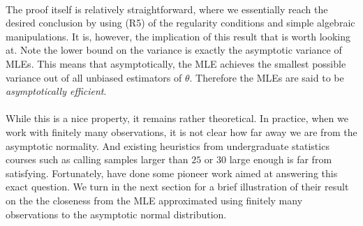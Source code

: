 $ $\\
The proof itself is relatively straightforward, where we essentially reach the desired conclusion by using (R5) of the regularity conditions and simple algebraic manipulations. It is, however, the implication of this result that is worth looking at. Note the lower bound on the variance is exactly the asymptotic variance of MLEs. This means that asymptotically, the MLE achieves the smallest possible variance out of all unbiased estimators of $\theta$. Therefore the MLEs are said to be \emph{asymptotically efficient}.\\\\
While this is a nice property, it remains rather theoretical. In practice, when we work with finitely many observations, it is not clear how far away we are from the asymptotic normality. And existing heuristics from undergraduate statistics courses such as calling samples larger than $25$ or $30$ large enough is far from satisfying. Fortunately, \cite{anastasiou2015bounds} have done some pioneer work aimed at answering this exact question. We turn in the next section for a brief illustration of their result on the the closeness from the MLE approximated using finitely many observations to the asymptotic normal distribution.
